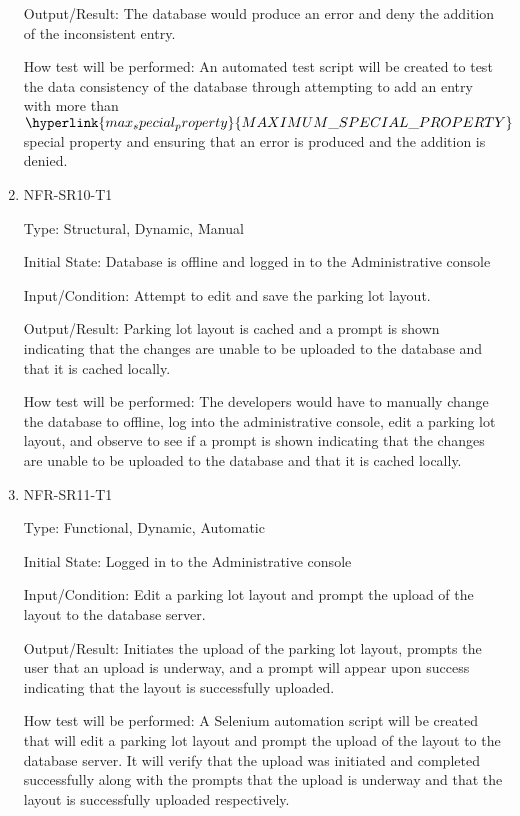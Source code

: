 \documentclass[12pt, titlepage]{article}
\begin{document}
\begin{enumerate}
Output/Result: The database would produce an error and deny the addition of the
inconsistent entry.

How test will be performed: An automated test script will be created to test the
data consistency of the database through attempting to add an entry with more
than $\hyperlink{max_special_property}{MAXIMUM\_SPECIAL\_PROPERTY}$ special
property and ensuring that an error is produced and the addition is denied.

\item{NFR-SR10-T1}

Type: Structural, Dynamic, Manual
					
Initial State: Database is offline and logged in to the Administrative console
					
Input/Condition: Attempt to edit and save the parking lot layout.
					
Output/Result: Parking lot layout is cached and a prompt is shown indicating
that the changes are unable to be uploaded to the database and that it is cached
locally.

How test will be performed: The developers would have to manually change the
database to offline, log into the administrative console, edit a parking lot
layout, and observe to see if a prompt is shown indicating that the changes are
unable to be uploaded to the database and that it is cached locally.

\item{NFR-SR11-T1}

Type: Functional, Dynamic, Automatic
					
Initial State: Logged in to the Administrative console
					
Input/Condition: Edit a parking lot layout and prompt the upload of the layout
to the database server.
					
Output/Result: Initiates the upload of the parking lot layout, prompts the user
that an upload is underway, and a prompt will appear upon success indicating
that the layout is successfully uploaded.

How test will be performed: A Selenium automation script will be created that
will edit a parking lot layout and prompt the upload of the layout to the
database server. It will verify that the upload was initiated and completed
successfully along with the prompts that the upload is underway and that the
layout is successfully uploaded respectively.


\end{enumerate}
\end{document}
